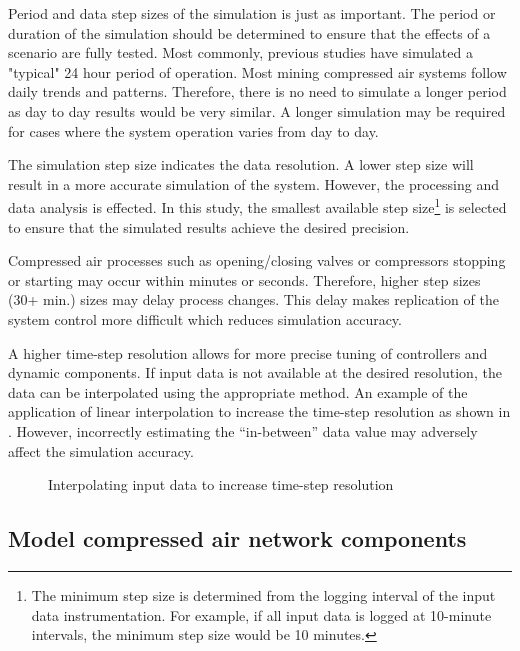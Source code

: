 	\par
	Period and data step sizes of the simulation is just as important. The period or duration of the simulation should be determined to ensure that the effects of a scenario are fully tested. Most commonly, previous studies have simulated a "typical" 24 hour period of operation. Most mining compressed air systems follow daily trends and patterns. Therefore, there is no need to simulate a longer period as day to day results would be very similar. A longer simulation may be required for cases where the system operation varies from day to day.
	\par 
	The simulation step size indicates the data resolution. A lower step size will result in a more accurate simulation of the system. However, the processing and data analysis is effected. In this study, the smallest available step size\footnote{The minimum step size is determined from the logging interval of the input data instrumentation. For example, if all input data is logged at 10-minute intervals, the minimum step size would be 10 minutes.} is selected to ensure that the simulated results achieve the desired precision. 
	\par 
	 Compressed air processes such as opening/closing valves or compressors stopping or starting may occur within minutes or seconds. Therefore, higher step sizes (30+ min.) sizes may delay process changes. This delay makes replication of the system control more difficult which reduces simulation accuracy.
	\par
	A higher time-step resolution allows for more precise tuning of controllers and dynamic components. If input data is not available at the desired resolution, the data can be interpolated using the appropriate method. An example of the application of linear interpolation to increase the time-step resolution as shown in . However, incorrectly estimating the \enquote{in-between}  data value may adversely affect the simulation accuracy.
	
	\begin{figure}[h]
		\centering
		\fbox{}
		\caption{Interpolating input data to increase time-step resolution}
		\label{fig: Inter}
	\end{figure}
	\subsection{Model compressed air network components}
